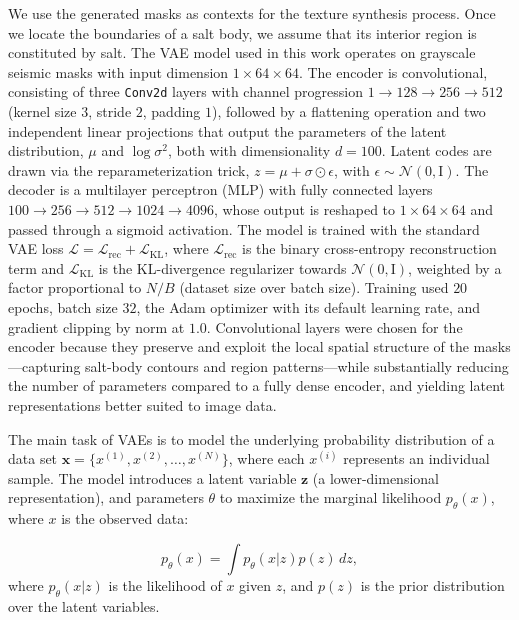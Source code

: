 \documentclass{ieeeaccess}
\begin{document}
We use the generated masks as contexts for the texture synthesis process. Once we locate the boundaries of a salt body, we assume that its interior region is constituted by salt. The VAE model used in this work operates on grayscale seismic masks with input dimension $1 \times 64 \times 64$. The encoder is convolutional, consisting of three \texttt{Conv2d} layers with channel progression $1 \rightarrow 128 \rightarrow 256 \rightarrow 512$ (kernel size $3$, stride $2$, padding $1$), followed by a flattening operation and two independent linear projections that output the parameters of the latent distribution, $\mu$ and $\log \sigma^2$, both with dimensionality $d = 100$. Latent codes are drawn via the reparameterization trick, $z = \mu + \sigma \odot \epsilon$, with $\epsilon \sim \mathcal{N}(0, \mathrm{I})$. The decoder is a multilayer perceptron (MLP) with fully connected layers $100 \rightarrow 256 \rightarrow 512 \rightarrow 1024 \rightarrow 4096$, whose output is reshaped to $1 \times 64 \times 64$ and passed through a sigmoid activation. The model is trained with the standard VAE loss $\mathcal{L} = \mathcal{L}_{\mathrm{rec}} + \mathcal{L}_{\mathrm{KL}}$, where $\mathcal{L}_{\mathrm{rec}}$ is the binary cross-entropy reconstruction term and $\mathcal{L}_{\mathrm{KL}}$ is the KL-divergence regularizer towards $\mathcal{N}(0, \mathrm{I})$, weighted by a factor proportional to $N/B$ (dataset size over batch size). Training used $20$ epochs, batch size $32$, the Adam optimizer with its default learning rate, and gradient clipping by norm at $1.0$. Convolutional layers were chosen for the encoder because they preserve and exploit the local spatial structure of the masks—capturing salt-body contours and region patterns—while substantially reducing the number of parameters compared to a fully dense encoder, and yielding latent representations better suited to image data.

The main task of VAEs is to model the underlying probability distribution of a data set $\bm{x} = \{x^{(1)}, x^{(2)}, \ldots, x^{(N)}\}$, where each $x^{(i)}$ represents an individual sample. The model introduces a latent variable $\bm{z}$ (a lower-dimensional representation), and parameters $\theta$ to maximize the marginal likelihood $p_\theta(x)$, where $x$ is the observed data:

\begin{equation}
p_\theta(x) = \int p_\theta(x | z) p(z) \, dz,
\end{equation}
where $p_\theta(x | z)$ is the likelihood of $x$ given $z$, and $p(z)$ is the prior distribution over the latent variables.
\end{document}
